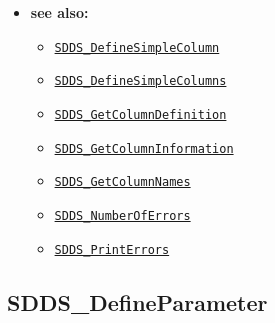 \documentclass[11pt]{article}
\newcommand{\progref}[1]{\hyperref[SDDS_#1]{\tt SDDS\_#1}}
\begin{document}
\begin{itemize}
\item {\bf see also:}
\begin{itemize}
\item \progref{DefineSimpleColumn}
\item \progref{DefineSimpleColumns}
\item \progref{GetColumnDefinition}
\item \progref{GetColumnInformation}
\item \progref{GetColumnNames}
\item \progref{NumberOfErrors}
\item \progref{PrintErrors}
\end{itemize}
\end{itemize}

\subsection{SDDS\_DefineParameter}
\label{SDDS_DefineParameter}
\end{document}
